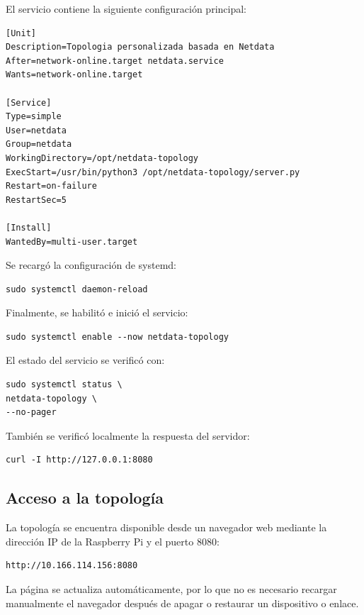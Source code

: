 El servicio contiene la siguiente configuración principal:

\begin{lstlisting}[style=terminal]
[Unit]
Description=Topologia personalizada basada en Netdata
After=network-online.target netdata.service
Wants=network-online.target

[Service]
Type=simple
User=netdata
Group=netdata
WorkingDirectory=/opt/netdata-topology
ExecStart=/usr/bin/python3 /opt/netdata-topology/server.py
Restart=on-failure
RestartSec=5

[Install]
WantedBy=multi-user.target
\end{lstlisting}

Se recargó la configuración de systemd:

\begin{lstlisting}[style=terminal]
sudo systemctl daemon-reload
\end{lstlisting}

Finalmente, se habilitó e inició el servicio:

\begin{lstlisting}[style=terminal]
sudo systemctl enable --now netdata-topology
\end{lstlisting}

El estado del servicio se verificó con:

\begin{lstlisting}[style=terminal]
sudo systemctl status \
netdata-topology \
--no-pager
\end{lstlisting}

También se verificó localmente la respuesta del servidor:

\begin{lstlisting}[style=terminal]
curl -I http://127.0.0.1:8080
\end{lstlisting}

\subsection{Acceso a la topología}

La topología se encuentra disponible desde un navegador web mediante la
dirección IP de la Raspberry Pi y el puerto 8080:

\begin{lstlisting}[style=terminal]
http://10.166.114.156:8080
\end{lstlisting}

La página se actualiza automáticamente, por lo que no es necesario recargar
manualmente el navegador después de apagar o restaurar un dispositivo o
enlace.

